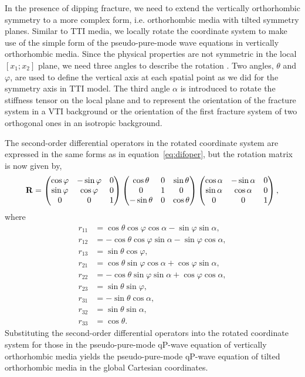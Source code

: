 In the presence of dipping fracture, we need to extend the vertically orthorhombic
 symmetry to a more complex form, i.e. orthorhombic media with tilted symmetry planes.
 Similar to TTI media, we locally rotate the coordinate system to make use of the simple form of the pseudo-pure-mode wave equations
 in vertically orthorhombic media. Since the physical properties are not symmetric in the local $[x_{1};x_{2}]$ plane, we need three angles
 to describe the rotation \cite[]{zhang.zhang:2011}. Two angles, $\theta$ and $\varphi$, are used to define the vertical axis at each
 spatial point as we did for the symmetry axis in TTI model. The third angle $\alpha$ is introduced to rotate the stiffness tensor 
on the local  plane and to represent the orientation of the fracture system in a VTI background or the orientation of the first
 fracture system of two orthogonal ones in an isotropic background.

The second-order differential operators in the rotated coordinate system are expressed in 
the same forms as in equation~\ref{eq:difoper}, but the rotation matrix is now given by,
\begin{equation}
\mathbf{R}=
\begin{pmatrix}\cos{\varphi} & -\sin{\varphi} &0 \cr
          \sin{\varphi} & \cos{\varphi} &0 \cr
          0 & 0 & 1\end{pmatrix}
\begin{pmatrix}\cos{\theta} & 0 & \sin{\theta} \cr
          0 & 1 & 0 \cr
          -\sin{\theta} & 0 & \cos{\theta}\end{pmatrix}
\begin{pmatrix}\cos{\alpha}  &-\sin{\alpha} &0 \cr
          \sin{\alpha} &\cos{\alpha} &0 \cr
          0 & 0 & 1\end{pmatrix},
\end{equation}
where
\begin{equation}
\begin{split}
r_{11}&=\cos{\theta}\cos{\varphi}\cos{\alpha}-\sin{\varphi}\sin{\alpha}, \\
r_{12}&=-\cos{\theta}\cos{\varphi}\sin{\alpha}-\sin{\varphi}\cos{\alpha}, \\
r_{13}&=\sin{\theta}\cos{\varphi},  \\
r_{21}&=\cos{\theta}\sin{\varphi}\cos{\alpha}+\cos{\varphi}\sin{\alpha}, \\
r_{22}&=-\cos{\theta}\sin{\varphi}\sin{\alpha}+\cos{\varphi}\cos{\alpha}, \\
r_{23}&=\sin{\theta}\sin{\varphi}, \\
r_{31}&=-\sin{\theta}\cos{\alpha}, \\
r_{32}&=\sin{\theta}\sin{\alpha}, \\
r_{33}&=\cos{\theta}.
\end{split}
\end{equation}
Substituting the second-order differential operators into the rotated coordinate system for
 those in the pseudo-pure-mode qP-wave equation
of vertically orthorhombic media yields the pseudo-pure-mode qP-wave equation of 
tilted orthorhombic media in the global Cartesian coordinates.
